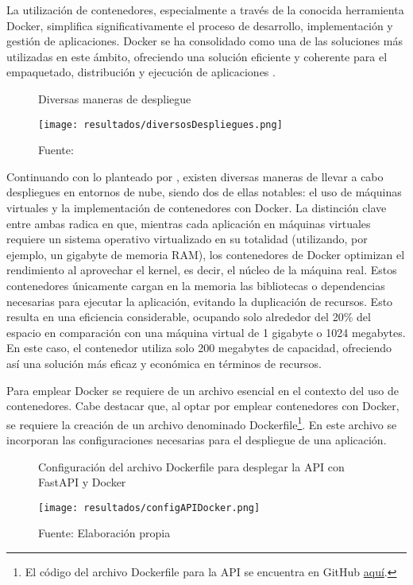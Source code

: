 La utilización de contenedores, especialmente a través de la conocida herramienta Docker, simplifica significativamente el proceso de desarrollo, implementación y gestión de aplicaciones. Docker se ha consolidado como una de las soluciones más utilizadas en este ámbito, ofreciendo una solución eficiente y coherente para el empaquetado, distribución y ejecución de aplicaciones \citep{orovengua2016}.

\begin{figure}[h]
	\centering
	\caption{Diversas maneras de despliegue}
	\texttt{[image: resultados/diversosDespliegues.png]}
	\caption*{\footnotesize Fuente: \cite{orovengua2016}}
	\label{fig:figuraDiversosDespliegues}
\end{figure}

\newpage

Continuando con lo planteado por \cite{orovengua2016}, existen diversas maneras de llevar a cabo despliegues en entornos de nube, siendo dos de ellas notables: el uso de máquinas virtuales y la implementación de contenedores con Docker. La distinción clave entre ambas radica en que, mientras cada aplicación en máquinas virtuales requiere un sistema operativo virtualizado en su totalidad (utilizando, por ejemplo, un gigabyte de memoria RAM), los contenedores de Docker optimizan el rendimiento al aprovechar el kernel, es decir, el núcleo de la máquina real. Estos contenedores únicamente cargan en la memoria las bibliotecas o dependencias necesarias para ejecutar la aplicación, evitando la duplicación de recursos. Esto resulta en una eficiencia considerable, ocupando solo alrededor del 20\% del espacio en comparación con una máquina virtual de 1 gigabyte o 1024 megabytes. En este caso, el contenedor utiliza solo 200 megabytes de capacidad, ofreciendo así una solución más eficaz y económica en términos de recursos.

Para emplear Docker se requiere de un archivo esencial en el contexto del uso de contenedores. Cabe destacar que, al optar por emplear contenedores con Docker, se requiere la creación de un archivo denominado Dockerfile\footnote{El código del archivo Dockerfile para la API se encuentra en GitHub \href{https://github.com/juferoto/mlops_project/tree/master/application/src}{aquí}.}. En este archivo se incorporan las configuraciones necesarias para el despliegue de una aplicación.


\begin{figure}[h]
	\centering
	\caption{Configuración del archivo Dockerfile para desplegar la API con FastAPI y Docker}
	\texttt{[image: resultados/configAPIDocker.png]}
	\caption*{\footnotesize Fuente: Elaboración propia}
	\label{fig:figuraConfigAPIDocker}
\end{figure}

